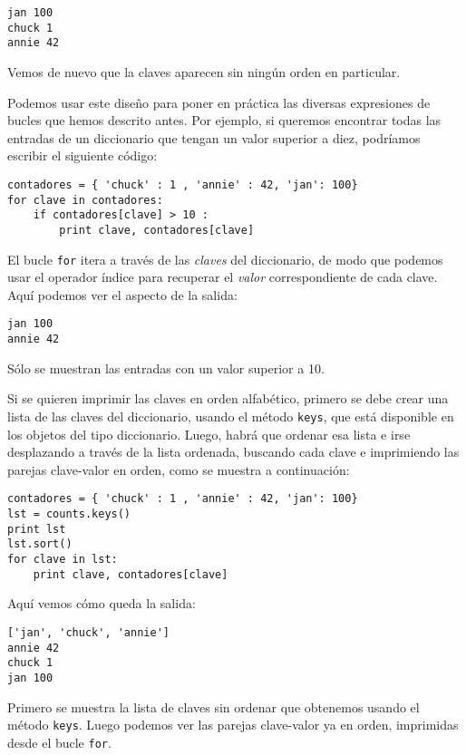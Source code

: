 \beforeverb
\begin{verbatim}
jan 100
chuck 1
annie 42
\end{verbatim}
\afterverb
%
Vemos de nuevo que la claves aparecen sin ningún orden en particular.

Podemos usar este diseño para poner en práctica las diversas expresiones de bucles
que hemos descrito antes. Por ejemplo, si queremos
encontrar todas las entradas de un diccionario que tengan un valor
superior a diez, podríamos escribir el siguiente código:

\beforeverb
\begin{verbatim}
contadores = { 'chuck' : 1 , 'annie' : 42, 'jan': 100}
for clave in contadores:
    if contadores[clave] > 10 :
        print clave, contadores[clave]
\end{verbatim}
\afterverb
%
El bucle {\tt for} itera a través de las
{\em claves} del diccionario, de modo que podemos
usar el operador índice para recuperar el
{\em valor} correspondiente
de cada clave.
Aquí podemos ver el aspecto de la salida:

\beforeverb
\begin{verbatim}
jan 100
annie 42
\end{verbatim}
\afterverb
%
Sólo se muestran las entradas con un valor superior a 10.

Si se quieren imprimir las claves en orden alfabético, primero
se debe crear una lista de las claves del diccionario, usando el
método {\tt keys}, que está disponible en los objetos del tipo diccionario.
Luego, habrá que ordenar esa lista
e irse desplazando a través de la lista ordenada, buscando cada
clave e imprimiendo las parejas clave-valor en orden,
como se muestra a continuación:

\beforeverb
\begin{verbatim}
contadores = { 'chuck' : 1 , 'annie' : 42, 'jan': 100}
lst = counts.keys()
print lst
lst.sort()
for clave in lst:
    print clave, contadores[clave]
\end{verbatim}
\afterverb
%
Aquí vemos cómo queda la salida:

\beforeverb
\begin{verbatim}
['jan', 'chuck', 'annie']
annie 42
chuck 1
jan 100
\end{verbatim}
\afterverb
%
Primero se muestra la lista de claves sin ordenar que
obtenemos usando el método {\tt keys}. Luego podemos ver las
parejas clave-valor ya en orden, imprimidas desde el bucle {\tt for}.

